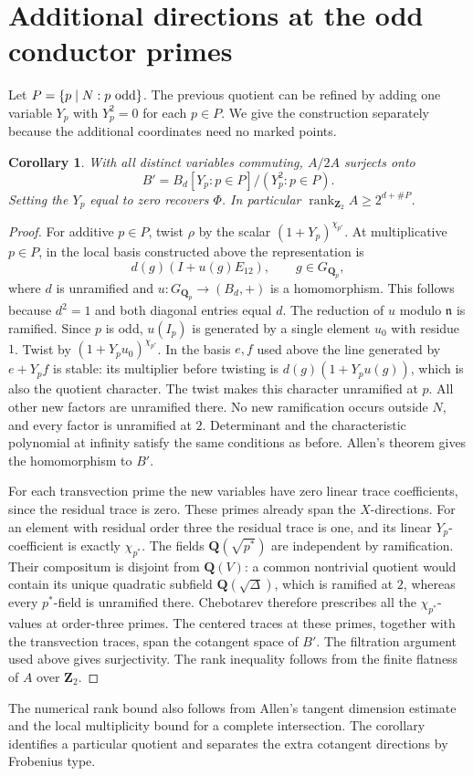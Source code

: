 \documentclass[11pt]{article}
\newtheorem{corollary}[theorem]{Corollary}
\newcommand{\Q}{\mathbf Q}
\newcommand{\Z}{\mathbf Z}
\newcommand{\n}{\mathfrak n}
\begin{document}
\section{Additional directions at the odd conductor primes}
Let \(P=\{p\mid N:p\ {\rm odd}\}\). The previous quotient can be refined by adding one variable \(Y_p\) with \(Y_p^2=0\) for each \(p\in P\). We give the construction separately because the additional coordinates need no marked points.

\begin{corollary}\label{extras}
With all distinct variables commuting, \(A/2A\) surjects onto
\[
 B'= B_d[Y_p:p\in P]/(Y_p^2:p\in P).
\]
Setting the \(Y_p\) equal to zero recovers \(\Phi\). In particular \(\operatorname{rank}_{\Z_2} A\ge 2^{d+\#P}\).
\end{corollary}
\begin{proof}
For additive \(p\in P\), twist \(\rho\) by the scalar \((1+Y_p)^{\chi_{p^*}}\). At multiplicative \(p\in P\), in the local basis constructed above the representation is
\[
 d(g)(I+u(g)E_{12}),\qquad g\in G_{\Q_p},
\]
where \(d\) is unramified and \(u:G_{\Q_p}\to (B_d,+)\) is a homomorphism. This follows because \(d^2=1\) and both diagonal entries equal \(d\). The reduction of \(u\) modulo \(\n\) is ramified. Since \(p\) is odd, \(u(I_p)\) is generated by a single element \(u_0\) with residue \(1\). Twist by \((1+Y_p u_0)^{\chi_{p^*}}\). In the basis \(e,f\) used above the line generated by \(e+Y_p f\) is stable: its multiplier before twisting is \(d(g)(1+Y_p u(g))\), which is also the quotient character. The twist makes this character unramified at \(p\). All other new factors are unramified there. No new ramification occurs outside \(N\), and every factor is unramified at \(2\). Determinant and the characteristic polynomial at infinity satisfy the same conditions as before. Allen's theorem gives the homomorphism to \(B'\).

For each transvection prime the new variables have zero linear trace coefficients, since the residual trace is zero. These primes already span the \(X\)-directions. For an element with residual order three the residual trace is one, and its linear \(Y_p\)-coefficient is exactly \(\chi_{p^*}\). The fields \(\Q(\sqrt{p^*})\) are independent by ramification. Their compositum is disjoint from \(\Q(V)\): a common nontrivial quotient would contain its unique quadratic subfield \(\Q(\sqrt\Delta)\), which is ramified at \(2\), whereas every \(p^*\)-field is unramified there. Chebotarev therefore prescribes all the \(\chi_{p^*}\)-values at order-three primes. The centered traces at these primes, together with the transvection traces, span the cotangent space of \(B'\). The filtration argument used above gives surjectivity. The rank inequality follows from the finite flatness of \(A\) over \(\Z_2\).
\end{proof}
The numerical rank bound also follows from Allen's tangent dimension estimate and the local multiplicity bound for a complete intersection. The corollary identifies a particular quotient and separates the extra cotangent directions by Frobenius type.
\end{document}
